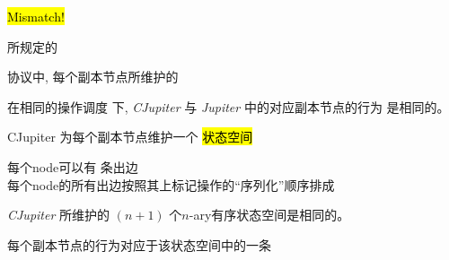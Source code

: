 \begin{frame}{}
  \begin{center}
    \hl{\Huge Mismatch!}

    \vspace{1.00cm}
    {\large \blue{\wlspec{}} 所规定的}

    \vspace{0.20cm}
    \vspace{0.20cm}

    {\large {} 协议中, 每个副本节点所维护的}
  \end{center}
\end{frame}

\begin{frame}{}
  \centerline{\LARGE {}}

  \pause
  \vspace{1.0cm}
  \begin{ctheorem}[等价性]
    在相同的操作调度 \emph{} 下, 
    \emph{CJupiter} 与 \emph{Jupiter} 中的对应副本节点的行为 \emph{} 是相同的。
  \end{ctheorem}
\end{frame}

\begin{frame}{}
  \begin{center}
    {\large CJupiter 为每个副本节点维护一个 \hl{ 状态空间}}
  \end{center}

  \begin{center}
    \resizebox{0.40\textwidth}{!}{}
  \end{center}

  \pause
  \begin{center} 
    每个node可以有  条出边 \\[5pt] 
    每个node的所有出边按照其上标记操作的``序列化''顺序排成
  \end{center}
\end{frame}

\begin{frame}{}
  \begin{center}
    \begin{prop}
      {\large \emph{CJupiter} 所维护的 $(n+1)$ 个$n$-ary有序状态空间是相同的。}
    \end{prop}

    \resizebox{0.45\textwidth}{!}{}

    \pause
    每个副本节点的行为对应于该状态空间中的一条\hl{} \\[3pt]
    \pause
  \end{center}
\end{frame}

